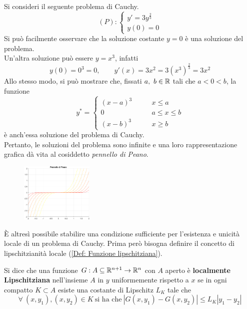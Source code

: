 \begin{example}
Si consideri il seguente problema di Cauchy.
\begin{equation*}
    (P):\begin{cases}
        y'=3y^{\frac{2}{3}}\\
        y(0)=0
    \end{cases}
\end{equation*}
Si può facilmente osservare che la soluzione costante $y=0$ è una soluzione del problema.\\
Un'altra soluzione può essere $y=x^3$, infatti
\begin{equation*}
    y(0)=0^3=0, \qquad y'(x)=3x^2=3(x^3)^\frac{2}{3}=3x^2
\end{equation*}
Allo stesso modo, si può mostrare che, fissati $a,\ b \in \mathbb{R}$ tali che $a<0<b$, la funzione
\begin{equation*}
y^*= \begin{cases}
    (x-a)^3 &\qquad x\leq a\\
    0 &\qquad a \leq x \leq b\\
    (x-b)^3 &\qquad x \geq b
\end{cases}
\end{equation*}
è anch'essa soluzione del problema di Cauchy.\\
Pertanto, le soluzioni del problema sono infinite e una loro rappresentazione grafica dà vita al cosiddetto \textit{pennello di Peano}.
\begin{figure}[H]
\centering
\includegraphics[width=0.31\textwidth]{Capitoli/Capitolo8/Pennello di Peano.png}
\end{figure}
\end{example}
È altresì possibile stabilire una condizione sufficiente per l'esistenza e unicità locale di un problema di Cauchy. Prima però bisogna definire il concetto di lipschitzianità locale (\ref{Def: Funzione lipschitziana}).
\begin{definition}
    Si dice che una funzione $G: A\subseteq \mathbb{R}^{n+1} \to \mathbb{R}^n$ con $A$ aperto è \textbf{localmente Lipschitziana} nell'insieme $A$ in $y$ uniformemente rispetto a $x$ se in ogni compatto $K \subset A$ esiste una costante di Lipschitz $L_K$ tale che
    \begin{equation}
        \forall\ (x, y_1), (x, y_2) \in K \ \text{si ha che}\ |G(x, y_1)-G(x, y_2)| \leq L_K |y_1-y_2|
    \end{equation}
\end{definition}
